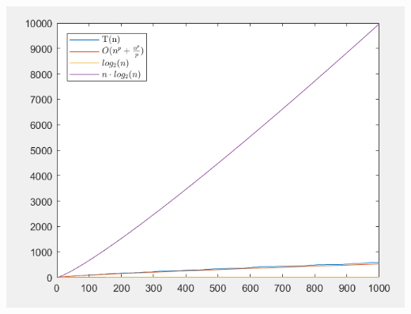 \documentclass[12pt]{article}
\begin{document}
\begin{center}
    \includegraphics[scale=0.6]{compar3.png}
\end{center}
\end{document}
